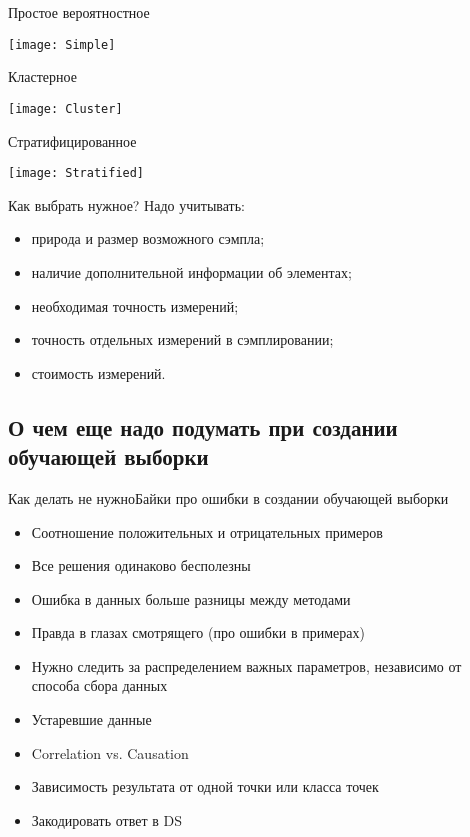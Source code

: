 \documentclass[14pt, fleqn, xcolor={dvipsnames, table}]{beamer}
\begin{document}
\begin{frame}{Простое вероятностное}
\begin{center}
\texttt{[image: Simple]}
\end{center}
\end{frame}

\begin{frame}{Кластерное}
\begin{center}
\texttt{[image: Cluster]}
\end{center}
\end{frame}

\begin{frame}{Стратифицированное}
\begin{center}
\texttt{[image: Stratified]}
\end{center}
\end{frame}

\begin{frame}{Как выбрать нужное?}
Надо учитывать:
\begin{itemize}
   \item природа и размер возможного сэмпла;
   \item наличие дополнительной информации об элементах;
   \item необходимая точность измерений;
   \item точность отдельных измерений в сэмплировании;
   \item стоимость измерений.
\end{itemize}
\end{frame}

\subsection{О чем еще надо подумать при создании обучающей выборки}
\begin{frame}{Как делать не нужно}{Байки про ошибки в создании обучающей выборки}
\small
\begin{itemize}
  \item Соотношение положительных и отрицательных примеров %
  \item Все решения одинаково бесполезны %
  \item Ошибка в данных больше разницы между методами %
  \item Правда в глазах смотрящего (про ошибки в примерах) %
  \item Нужно следить за распределением важных параметров, независимо от способа сбора данных %
  \item Устаревшие данные %
  \item Correlation vs. Causation %
  \item Зависимость результата от одной точки или класса точек %
  \item Закодировать ответ в DS %
\end{itemize}
\end{frame}
\end{document}
